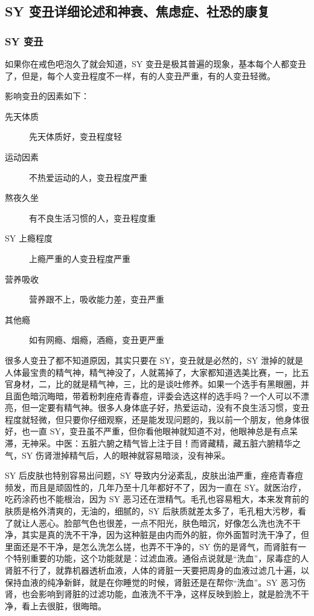 \subsection{SY 变丑详细论述和神衰、焦虑症、社恐的康复}

\subsubsection{SY 变丑}

如果你在戒色吧泡久了就会知道，SY 变丑是极其普遍的现象，基本每个人都变丑了，但是，每个人变丑程度不一样，有的人变丑严重，有的人变丑轻微。

影响变丑的因素如下：

\begin{multicols}{2}
    \begin{description}
        \item[先天体质] 先天体质好，变丑程度轻
        \item[运动因素] 不热爱运动的人，变丑程度严重
        \item[熬夜久坐] 有不良生活习惯的人，变丑程度重
        \item[SY 上瘾程度] 上瘾严重的人变丑程度严重
        \item[营养吸收] 营养跟不上，吸收能力差，变丑严重
        \item[其他瘾] 如有网瘾、烟瘾，酒瘾，变丑更严重
    \end{description}
\end{multicols}

很多人变丑了都不知道原因，其实只要在 SY，变丑就是必然的，SY 泄掉的就是人体最宝贵的精气神，精气神没了，人就蔫掉了，大家都知道选美比赛，一，比五官身材，二，比的就是精气神，三，比的是谈吐修养。如果一个选手有黑眼圈，并且面色暗沉晦暗，带着粉刺痤疮青春痘，评委会选这样的选手吗？一个人可以不漂亮，但一定要有精气神。很多人身体底子好，热爱运动，没有不良生活习惯，变丑程度就轻微，但只要你仔细观察，还是能发现问题的，我以前一个朋友，他身体很好，也一直 SY，变丑虽不严重，但你看他眼神就知道不对，他眼神总是有点呆滞，无神采。中医：五脏六腑之精气皆上注于目！而肾藏精，藏五脏六腑精华之气，SY 伤肾泄掉精气后，人的眼神就容易暗淡，没有神采。

SY 后皮肤也特别容易出问题，SY 导致内分泌紊乱，皮肤出油严重，痤疮青春痘频发，而且是顽固性的，几年乃至十几年都好不了，因为一直在 SY。就医治疗，吃药涂药也不能根治，因为 SY 恶习还在泄精气。毛孔也容易粗大，本来发育前的肤质是格外清爽的，无油的，细腻的，SY 后肤质就差太多了，毛孔粗大污秽，看了就让人恶心。脸部气色也很差，一点不阳光，肤色暗沉，好像怎么洗也洗不干净，其实是真的洗不干净，因为这种脏是由内而外的脏，你外面暂时洗干净了，但里面还是不干净，是怎么洗怎么搓，也弄不干净的，SY 伤的是肾气，而肾脏有一个特别重要的功能，这个功能就是：过滤血液。通俗点说就是“洗血”，尿毒症的人肾脏不行了，就靠机器透析血液，人体的肾脏一天要把周身的血液过滤几十遍，以保持血液的纯净新鲜，就是在你睡觉的时候，肾脏还是在帮你“洗血”。SY 恶习伤肾，也会影响到肾脏的过滤功能，血液洗不干净，这样反映到脸上，就是脸洗不干净，看上去很脏，很晦暗。

